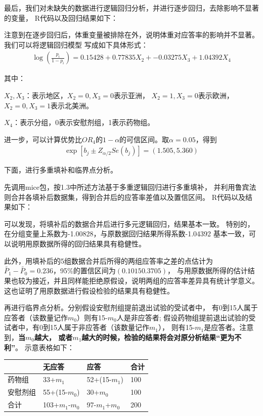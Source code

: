 \documentclass{article}
\begin{document}
最后，我们对未缺失的数据进行逻辑回归分析，并进行逐步回归，去除影响不显著的变量，
R代码以及回归结果如下：
 

注意到在逐步回归后，体重变量被排除在外，说明体重对应答率的影响并不显著。我们可以将逻辑回归模型
写成如下具体形式：
\begin{align*}
    \log\left(\frac{p_i}{1-p_i}\right) =
    0.15428 + 0.77835 X_2 + -0.03275 X_3 + 1.04392 X_4
\end{align*}
\par 其中：
\par $X_2,X_3$：表示地区，$X_2=0,X_3=0$表示亚洲，
    $X_2=1,X_3=0$表示欧洲，$X_2=0,X_3=1$表示北美洲。
\par $X_4$：表示分组，0表示安慰剂组，1表示药物组。

进一步，可以计算优势比$OR_4$的$1-\alpha$的可信区间。取$\alpha=0.05$，得到
\begin{align*}
    \exp \left[ b_j \pm Z_{\alpha/2} Se(b_j) \right]    =(1.505,5.360)
\end{align*}

下面，进行多重填补和临界点分析。

先调用mice包，按1.3中所述方法基于多重逻辑回归进行多重填补，
并利用鲁宾法则合并各填补后数据集，得到合并后的应答率差值以及置信区间。
R代码以及结果如下：


可以发现，将填补后的数据合并后进行多元逻辑回归，结果基本一致。
特别的，在分组变量上系数为-1.00828，与原数据回归结果所得系数-1.04392
基本一致，可以说明用原数据所得的回归结果具有稳健性。

此外，用填补后的5组数据合并后所得的两组应答率之差的点估计为
$\tilde{P_1}-\tilde{P_0} = 0.236$，95$\%$的置信区间为$(0.1015 0.3705)$，
与用原数据所得的估计结果也较为接近，并且同样能拒绝原假设，说明两组的应答率差异具有统计学意义。
这也证明了用原数据进行假设检验的结果具有稳健性。


再进行临界点分析。分别假设安慰剂组提前退出试验的受试者中，
有0到15人属于应答者（该数量记作$m_0$）则有15-$m_0$人是非应答者;
假设药物组提前退出试验的受试者中，有0到15人属于非应答者（该数量记作$m_1$），
则有15-$m_1$是应答者。注意到，\textbf{当$m_0$越大，
或者$m_1$越大的时候，检验的结果将会对原分析结果“更为不利”}。
示意表格如下：
\begin{table}[H]
    \centering
    \begin{tabular}{llll}
        \hline
         & 无应答 & 应答 & 合计  \\
         \hline
    药物组  & 33+$m_1$   & 52+(15-$m_1$)   & 100  \\
    安慰剂组 & 55+(15-$m_0$)   & 30+$m_0$   & 100  \\
    \hline
    合计   & 103+$m_1$-$m_0$   & 97-$m_1$+$m_0$   & 200\\
    \hline
    \end{tabular}
    \end{table}
\end{document}

